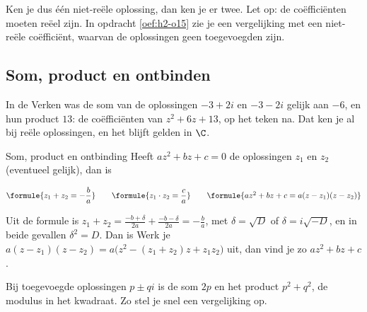 Ken je dus één niet-reële oplossing, dan ken je er twee. Let op: de coëfficiënten moeten reëel zijn. In opdracht \ref{oef:h2-o15} zie je een vergelijking met een niet-reële coëfficiënt, waarvan de oplossingen geen toegevoegden zijn.

\subsection{Som, product en ontbinden}

In de Verken was de som van de oplossingen $-3 + 2i$ en $-3 - 2i$ gelijk aan $-6$, en hun product $13$: de coëfficiënten van $z^2 + 6z + 13$, op het teken na. Dat ken je al bij reële oplossingen, en het blijft gelden in $\C$.

\begin{theorie}
\begin{stelling}{Som, product en ontbinding}
Heeft $az^2 + bz + c = 0$ de oplossingen $z_1$ en $z_2$ (eventueel gelijk), dan is

\vspace{1mm}
\qquad $\formule{z_1 + z_2 = -\dfrac{b}{a}} \qquad \formule{z_1 \cdot z_2 = \dfrac{c}{a}} \qquad \formule{az^2 + bz + c = a(z - z_1)(z - z_2)}$
\end{stelling}

\begin{bewijs}
Uit de formule is $z_1 + z_2 = \frac{-b + \delta}{2a} + \frac{-b - \delta}{2a} = -\frac{b}{a}$, met $\delta = \sqrt{D}$ of $\delta = i\sqrt{-D}$, en in beide gevallen $\delta^2 = D$. Dan is
Werk je $a(z - z_1)(z - z_2) = a\bigl(z^2 - (z_1 + z_2)z + z_1 z_2\bigr)$ uit, dan vind je zo $az^2 + bz + c$.
\end{bewijs}
\end{theorie}

Bij toegevoegde oplossingen $p \pm qi$ is de som $2p$ en het product $p^2 + q^2$, de modulus in het kwadraat. Zo stel je snel een vergelijking op.


